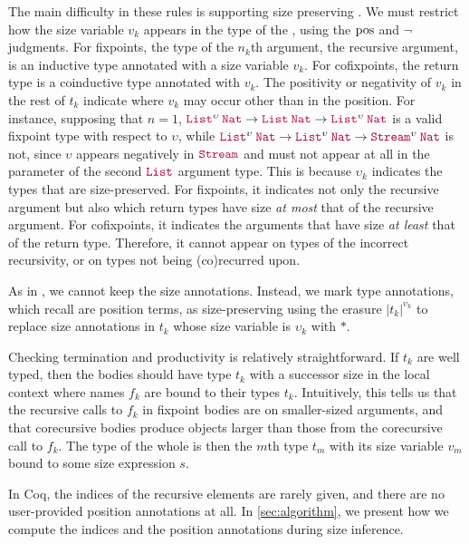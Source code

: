 The main difficulty in these rules is supporting size preserving \cofixpoints.
We must restrict how the size variable $v_k$ appears in the type of the \cofixpoints, using the $\mathrel{\text{pos}}$ and $\neg$ judgments.
For fixpoints, the type of the $n_k$th argument, the recursive argument, is an inductive type annotated with a size variable $v_k$.
For cofixpoints, the return type is a coinductive type annotated with $v_k$.
The positivity or negativity of $v_k$ in the rest of $t_k$ indicate where $v_k$ may occur other than in the \corecursive position.
For instance, supposing that $n = 1$,
$\app{\List^\upsilon}{\Nat} \to \app{\List}{\Nat} \to \app{\List^\upsilon}{\Nat}$
is a valid fixpoint type with respect to $\upsilon$, while
$\app{\List^\upsilon}{\Nat} \to \app{\List^\upsilon}{\Nat} \to \app{\Stream^\upsilon}{\Nat}$
is not, since $\upsilon$ appears negatively in $\Stream$ and must not appear at all in the parameter of the second $\List$ argument type.
This is because $\upsilon_k$ indicates the types that are size-preserved.
For fixpoints, it indicates not only the recursive argument but also which return types have size \textit{at most} that of the recursive argument.
For cofixpoints, it indicates the arguments that have size \textit{at least} that of the return type.
Therefore, it cannot appear on types of the incorrect recursivity, or on types not being (co)\-recurred upon.

As in , we cannot keep the size annotations.
Instead, we mark \cofixpoint type annotations, which recall are position terms,
as size-preserving using the erasure $|t_k|^{\upsilon_k}$ to replace size
annotations in $t_k$ whose size variable is $\upsilon_k$ with $*$.

Checking termination and productivity is relatively straightforward.
If $t_k$ are well typed, then the \cofixpoint bodies should have type $t_k$ with a successor size in the local context where \cofixpoint names $f_k$ are bound to their types $t_k$.
Intuitively, this tells us that the recursive calls to $f_k$ in fixpoint bodies are on smaller-sized arguments, and that corecursive bodies produce objects larger than those from the corecursive call to $f_k$.
The type of the whole \cofixpoint is then the $m$th type $t_m$ with its size variable $v_m$ bound to some size expression $s$.

In Coq, the indices of the recursive elements are rarely given, and there are no user-provided position annotations at all.
In \autoref{sec:algorithm}, we present how we compute the indices and the position annotations during size inference.

